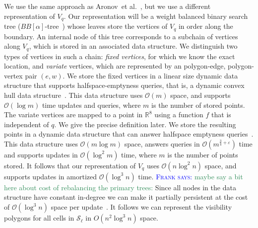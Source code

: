 \documentclass[UKenglish]{lipics-v2019}
\newcommand{\myremark}[4]{\textcolor{blue}{\textsc{#1 #2:}} \textcolor{#4}{\textsf{#3}}}
\newcommand{\frank}[2][says]{\myremark{Frank}{#1}{#2}{SeaGreen}}
\newcommand{\etal}{\textnormal{et al.}\xspace}
\newcommand{\mkmcal}[1]{\ensuremath{\mathcal{#1}}\xspace}
\renewcommand{\O}{\mkmcal{O}}
\renewcommand{\S}{\mkmcal{S}}
\newcommand{\eps}{\ensuremath{\varepsilon}\xspace}
\newcommand{\mkmbb}[1]{\ensuremath{\mathbb{#1}}\xspace}
\newcommand{\R}{\mkmbb{R}}
\begin{document}
We use the same approach as Aronov~\etal~\cite{aronov2002visibility},
but we use a different representation of $V_q$. Our representation
will be a weight balanced binary search tree
($BB[\alpha]$-tree~\cite{nievergelt1973bbalphatree}) whose leaves
store the vertices of $V_q$ in order along the boundary. An internal
node of this tree corresponds to a subchain of vertices along $V_q$,
which is stored in an associated data structure. We distinguish two
types of vertices in such a chain: \emph{fixed vertices}, for which we
know the exact location, and \emph{variate} vertices, which are
represented by an polygon-edge, polygon-vertex pair $(e,w)$. We store
the fixed vertices in a linear size dynamic data structure that
supports halfspace-emptyness queries, that is, a dynamic convex hull
data structure~\cite{dynamicCH}. This data structure uses $\O(m)$
space, and supports $\O(\log m)$ time updates and queries, where $m$
is the number of stored points. The variate vertices are mapped to a
point in $\R^8$ using a function $f$ that is independent of $q$. We
give the precise definition later. We store the resulting points in a
dynamic data structure that can answer halfspace emptyness
queries~\cite{agarwal1995dynamichalfspace}. This data structure uses
$\O(m\log m)$ space, answers queries in $\O(m^{\frac{3}{4}+\eps})$ time and
supports updates in $\O(\log^2 m)$ time, where $m$ is the number of
points stored. It follows that our representation of $V_q$ uses
$\O(n\log^2 n)$ space, and supports updates in amortized
$\O(\log^3 n)$ time.
\frank{maybe say a bit here about cost of
  rebalancing the primary trees:}
Since all nodes in the data structure have constant in-degree we can
make it partially persistent at the cost of $\O(\log^3 n)$ space per
update~\cite{driscoll1989persistent}. It follows we can represent the
visibility polygons for all cells in $\S_\ell$ in $O(n^2\log^3 n)$
space.
\end{document}
